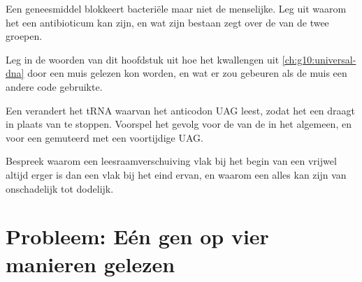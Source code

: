\begin{exercise}[$\star\star\star$]\label{exo:g11:gene-expression:12}
Een geneesmiddel blokkeert bacteriële  maar niet de menselijke.
Leg uit waarom het een antibioticum kan zijn, en wat zijn bestaan zegt
over de  van de twee groepen.
\end{exercise}

\begin{exercise}[$\star\star\star$]\label{exo:g11:gene-expression:13}
Leg in de woorden van dit hoofdstuk uit hoe het kwallengen uit
\cref{ch:g10:universal-dna} door een muis gelezen kon worden, en wat er
zou gebeuren als de muis een andere code gebruikte.
\end{exercise}

\begin{exercise}[$\star\star\star$]\label{exo:g11:gene-expression:14}
Een  verandert het tRNA waarvan het anticodon UAG leest, zodat het
een  draagt in plaats van te stoppen. Voorspel het gevolg voor
de  van de  in het algemeen, en voor een gemuteerd  met een
voortijdige UAG.
\end{exercise}

\begin{exercise}[$\star\star\star$]\label{exo:g11:gene-expression:15}
Bespreek waarom een leesraamverschuiving vlak bij het begin van een 
vrijwel altijd erger is dan een vlak bij het eind ervan, en waarom een
 alles kan zijn van onschadelijk tot dodelijk.
\end{exercise}

\section{Probleem: Eén gen op vier manieren gelezen}

